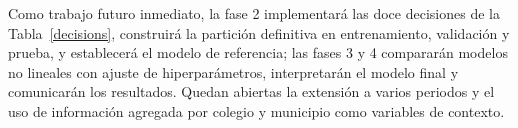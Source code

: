     \vspace{10pt}

    Como trabajo futuro inmediato, la fase 2 implementará las doce decisiones de
    la Tabla~\ref{decisions}, construirá la partición definitiva en
    entrenamiento, validación y prueba, y establecerá el modelo de referencia; las
    fases 3 y 4 compararán modelos no lineales con ajuste de hiperparámetros,
    interpretarán el modelo final y comunicarán los resultados. Quedan abiertas
    la extensión a varios periodos y el uso de información agregada por colegio y
    municipio como variables de contexto.
